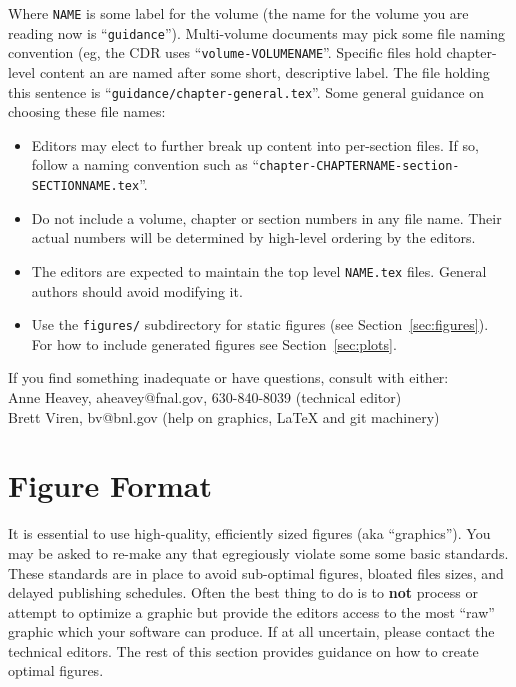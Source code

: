Where \texttt{NAME} is some label for the volume (the name for the
volume you are reading now is ``\texttt{guidance}'').
Multi-volume documents may pick some file naming convention (eg, the
CDR uses ``\texttt{volume-VOLUMENAME}''.
Specific files hold chapter-level content an are named after some
short, descriptive label.
The file holding this sentence is ``\texttt{guidance/chapter-general.tex}''.
Some general guidance on choosing these file names:

\begin{itemize}
\item Editors may elect to further break up content into per-section
  files.
  If so, follow a naming convention such as
  ``\texttt{chapter-CHAPTERNAME-section-SECTIONNAME.tex}''.
\item Do not include a volume, chapter or section numbers in any file
  name.
  Their actual numbers will be determined by high-level ordering by
  the editors. 
\item The editors are expected to maintain the top level
  \texttt{NAME.tex} files. General authors should avoid modifying it.
\item Use the \texttt{figures/} subdirectory for static figures (see
  Section~\ref{sec:figures}). For how to include generated figures see
  Section~\ref{sec:plots}.
\end{itemize}

If you find something inadequate or have questions, consult with either: \\
  Anne Heavey, aheavey@fnal.gov, 630-840-8039 (technical editor)\\
  Brett Viren, bv@bnl.gov (help on graphics, \LaTeX{} and git machinery)



\section{Figure Format}
\label{sec:figure-format}

It is essential to use high-quality, efficiently sized figures (aka
``graphics'').
You may be asked to re-make any that egregiously violate some some
basic standards.
These standards are in place to avoid sub-optimal figures, bloated
files sizes, and delayed publishing schedules.  
Often the best thing to do is to \textbf{not} process or attempt to
optimize a graphic but provide the editors access to the most ``raw''
graphic which your software can produce.
If at all uncertain, please contact the technical editors.
The rest of this section provides guidance on how to create optimal
figures.


